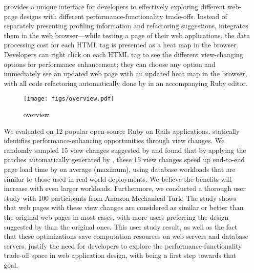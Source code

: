 \Tool provides a unique interface for developers to effectively
exploring different web-page designs with different performance-functionality trade-offs.
Instead of separately presenting profiling information and refactoring suggestions, \Tool integrates them in the web browser---while testing a page of their web applications, the data processing cost for each HTML tag is presented as a heat map in the browser. Developers can right click on each
HTML tag to see the different view-changing options for performance enhancement; they can 
choose any option and immediately see an updated web page with an updated heat map in the browser,
with all code refactoring automatically done by \Tool in an accompanying Ruby editor.






\begin{figure}
    \centering
    \texttt{[image: figs/overview.pdf]}
    \vspace{-0.1in}
    \caption{\Tool overview}
     \vspace{-0.2in}
    \label{fig:overview}
\end{figure}


We evaluated \Tool on 12 popular open-source Ruby on Rails applications.
\Tool statically identifies \numissues performance-enhancing
opportunities through view changes. We randomly sampled 15 view changes suggested
by \Tool and found that by applying the patches automatically generated by \Tool,
these 15 view changes speed up end-to-end page load time by \eoespeedup on average
(\maxspeedup maximum), using database workloads that are similar to those used in real-world deployments. We believe the benefits will increase with even larger workloads. %
Furthermore, we conducted a thorough user study with 100 participants from
Amazon Mechanical Turk. The study shows that web pages with these
view changes are considered as similar or better than the original web pages
in most cases, with more users preferring the design suggested by
\Tool than the original ones. This user study result, as well as the fact 
that these optimizations save computation resources on web servers and database servers, justify the need for developers to explore the performance-functionality 
trade-off space in web application design, with \Tool being a first step towards that goal.
